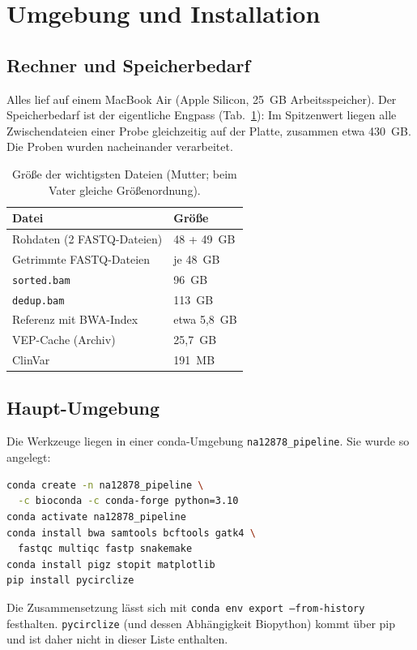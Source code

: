 \documentclass[10pt,a4paper,twocolumn]{article}
\begin{document}
\section{Umgebung und Installation}
\subsection{Rechner und Speicherbedarf}
Alles lief auf einem MacBook Air (Apple Silicon, 25~GB Arbeitsspeicher). Der Speicherbedarf ist der eigentliche Engpass (Tab.~\ref{tab:platz}): Im Spitzenwert liegen alle Zwischendateien einer Probe gleichzeitig auf der Platte, zusammen etwa 430~GB. Die Proben wurden nacheinander verarbeitet.
 
\begin{table}[t]
\centering\small
\caption{Größe der wichtigsten Dateien (Mutter; beim Vater gleiche Größenordnung).}
\label{tab:platz}
\begin{tabular}{@{}p{4.6cm}p{2.6cm}@{}}
\toprule
Datei & Größe\\
\midrule
Rohdaten (2 FASTQ-Dateien) & 48 + 49~GB\\
Getrimmte FASTQ-Dateien & je 48~GB\\
\texttt{sorted.bam} & 96~GB\\
\texttt{dedup.bam} & 113~GB\\
Referenz mit BWA-Index & etwa 5,8~GB\\
VEP-Cache (Archiv) & 25,7~GB\\
ClinVar & 191~MB\\
\bottomrule
\end{tabular}
\end{table}
 
\subsection{Haupt-Umgebung}
Die Werkzeuge liegen in einer conda-Umgebung \texttt{na12878\_pipeline}. Sie wurde so angelegt:
\begin{lstlisting}[language=bash]
conda create -n na12878_pipeline \
  -c bioconda -c conda-forge python=3.10
conda activate na12878_pipeline
conda install bwa samtools bcftools gatk4 \
  fastqc multiqc fastp snakemake
conda install pigz stopit matplotlib
pip install pycirclize
\end{lstlisting}
Die Zusammensetzung lässt sich mit \texttt{conda env export --from-history} festhalten. \texttt{pycirclize} (und dessen Abhängigkeit Biopython) kommt über pip und ist daher nicht in dieser Liste enthalten.
 
\end{document}

